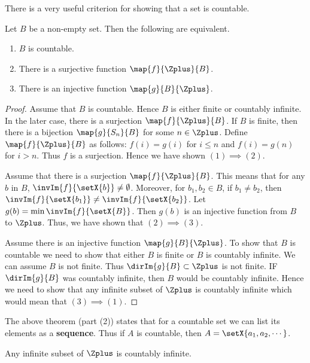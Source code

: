There is a very useful criterion for showing that a set is countable.
\begin{Theorem}
    Let $B$ be a non-empty set. Then the following are equivalent.
    \begin{enumerate}
	\item
	    $B$ is countable.
	\item
	    There is a surjective function $\map{f}{\Zplus}{B}$.
	\item
	    There is an injective function $\map{g}{B}{\Zplus}$.
    \end{enumerate}
\end{Theorem}
\begin{proof}
    Assume that $B$ is countable. Hence $B$ is either finite or countably infinite. In the later case, there
    is a surjection $\map{f}{\Zplus}{B}$. If $B$ is finite, then there is a bijection $\map{g}{S_n}{B}$
    for some $n\in\Zplus$. Define $\map{f}{\Zplus}{B}$ as follows:
    $f(i) = g(i)$ for $i \leq n$ and $f(i) = g(n)$ for $i > n$. Thus $f$ is a surjection. Hence we have shown
    $(1)\implies (2)$.

    Assume that there is a surjection $\map{f}{\Zplus}{B}$. This means that for any $b$ in $B$,
    $\invIm{f}{\setX{b}}\neq\emptyset$. Moreover, for $b_1,b_2 \in B$, if $b_1\neq b_2$, then
    $\invIm{f}{\setX{b_1}} \neq \invIm{f}{\setX{b_2}}$. Let $g(b) = \min\invIm{f}{\setX{B}}$. Then $g(b)$ is
    an injective function from $B$ to $\Zplus$. Thus, we have shown that $(2) \implies (3)$.

    Assume there is an injective function $\map{g}{B}{\Zplus}$. To show that $B$ is countable we need to show
    that either $B$ is finite or $B$ is countably infinite. We can assume $B$ is not finite. 
    Thus $\dirIm{g}{B} \subset {\Zplus}$ is not finite. IF $\dirIm{g}{B}$ was countably infinite, then $B$
    would be countably infinite. Hence we need to show that any infinite subset of $\Zplus$ is countably
    infinite which would mean that $(3)\implies (1)$.
\end{proof}
\begin{Remark}
    The above theorem (part (2)) 
    states that for a countable set we can list its elements as a \textbf{sequence}. Thus if
    $A$ is countable, then $A = \setX{a_{1},a_{2},\cdots}$.
\end{Remark}
\begin{Proposition}
    Any infinite subset of $\Zplus$ is countably infinite.
\end{Proposition}
